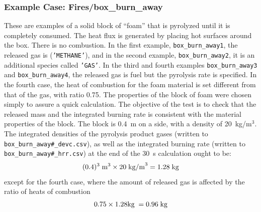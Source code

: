 \documentclass[11pt]{book}
\newcommand{\ct}{\tt\small}
\newcommand{\be}{\begin{equation}}
\newcommand{\ee}{\end{equation}}
\begin{document}
\subsubsection{Example Case: Fires/box\_burn\_away}

These are examples of a solid block of ``foam'' that is pyrolyzed
until it is completely consumed. The heat flux is generated by placing
hot surfaces around the box. There is no combustion.  In the first
example, {\ct box\_burn\_away1}, the released gas is ({\ct 'METHANE'}),
and in the second example, {\ct box\_burn\_away2}, it is an additional
species called {\ct 'GAS'}. In the third and fourth examples
{\ct box\_burn\_away3} and {\ct box\_burn\_away4}, the
released gas is fuel but the pyrolysis rate is specified.
In the fourth case, the heat of combustion for the foam material is set
different from that of the gas, with ratio 0.75.
The properties of the block of foam were chosen
simply to assure a quick calculation. The objective of the test is to
check that the released mass and the integrated burning rate is
consistent with the material properties of the block. The block is
0.4~m on a side, with a density of 20~kg/m$^3$.  The integrated
densities of the pyrolysis product gases (written to
{\ct box\_burn\_away\#\_devc.csv}), as well as
the integrated burning rate (written to {\ct box\_burn\_away\#\_hrr.csv}) at
the end of the 30~s calculation ought to be:
\be
(0.4)^3 \; \hbox{m}^3 \times 20 \; \hbox{kg/m}^3 = 1.28 \; \hbox{kg}
\ee
except for the fourth case, where the amount of released gas is affected by
the ratio of heats of combustion
\be
0.75\times 1.28 \hbox{kg}\; = 0.96\; \hbox{kg}
\ee
\end{document}

